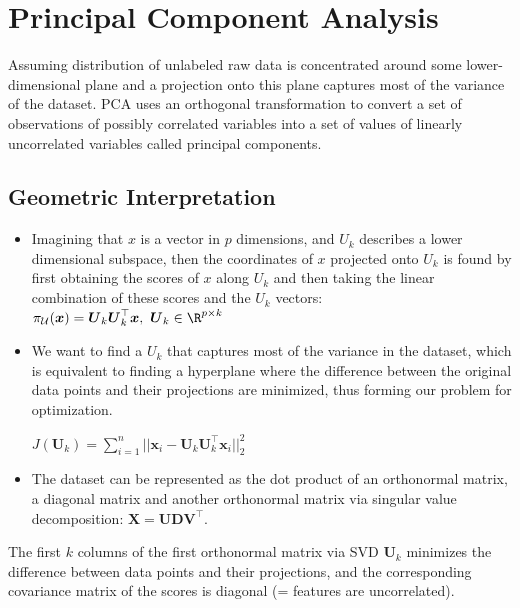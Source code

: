 \documentclass[english]{latex4ei/latex4ei_sheet}
\begin{document}
\newpage
\section{Principal Component Analysis}
\begin{sectionbox}
Assuming distribution of unlabeled raw data is concentrated around some lower-dimensional plane and a projection onto this plane captures most of the variance of the dataset. PCA uses an orthogonal transformation to convert a set of observations of possibly correlated variables into a set of values of linearly uncorrelated variables called principal components.\\
\subsection{Geometric Interpretation}
\begin{itemize}
\item Imagining that $x$ is a vector in $p$ dimensions, and $U_k$ describes a lower dimensional subspace, then the coordinates of $x$ projected onto $U_k$ is found by first obtaining the scores of $x$ along $U_k$ and then taking the linear combination of these scores and the $U_k$ vectors: $\pi_\mathcal{U}(\boldsymbol{x})=\boldsymbol{U}_k\boldsymbol{U}_k^{\top}\boldsymbol{x}, \ \boldsymbol{U}_k\in\R^{p\times k}$
\item We want to find a $U_k$ that captures most of the variance in the dataset, which is equivalent to finding a hyperplane where the difference between the original data points and their projections are minimized, thus forming our problem for optimization.\\
\begin{center}
    $J(\boldsymbol{U}_k)=\sum\limits_{i=1}^n||\boldsymbol{x}_i-\boldsymbol{U}_k\boldsymbol{U}_k^{\top}\boldsymbol{x}_i||^2_2$
\end{center}
\item The dataset can be represented as the dot product of an orthonormal matrix, a diagonal matrix and another orthonormal matrix via singular value decomposition: $\boldsymbol{X}=\boldsymbol{UDV}^{\top}$.
\end{itemize}
\begin{emphbox}
    The first $k$ columns of the first orthonormal matrix via SVD $\boldsymbol{U}_k$ minimizes the difference between data points and their projections, and the corresponding covariance matrix of the scores is diagonal (= features are uncorrelated).
\end{emphbox}

\end{sectionbox}
\end{document}
